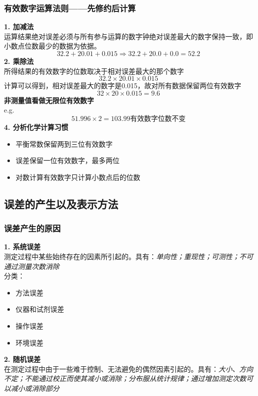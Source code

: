 \documentclass[utf8,a4paper,12pt]{ctexart}
\begin{document}
\subsubsection{有效数字运算法则——先修约后计算}
{\bf 1. 加减法}\\
运算结果绝对误差必须与所有参与运算的数字钟绝对误差最大的数字保持一致，即小数点位数最少的数据为依据。\\
\[32.2 + 20.01 + 0.015 \Rightarrow 32.2 + 20.0 + 0.0 = 52.2\]
{\bf 2. 乘除法}\\
所得结果的有效数字的位数取决于相对误差最大的那个数字\\
\[32.2 \times 20.01 \times 0.015\]
计算可以得到，相对误差最大的数字是0.015，故对所有数据保留两位有效数字
\[32\times 20\times 0.015 = 9.6\]
{\bf 非测量值看做无限位有效数字}\\
e.g.
\[51.996 \times 2 = 103.99 \text{有效数字位数不变}\]
{\bf 4. 分析化学计算习惯}\\
\begin{itemize}
\item 平衡常数保留两到三位有效数字
\item 误差保留一位有效数字，最多两位
\item 对数计算有效数字只计算小数点后的位数
\end{itemize}

\subsection{误差的产生以及表示方法}
\subsubsection{误差产生的原因}
{\bf 1. 系统误差}\\
测定过程中某些始终存在的因素所引起的。具有：\emph{单向性；重现性；可测性；不可通过测量次数消除}\\
分类：
\begin{itemize}
\item 方法误差
\item 仪器和试剂误差
\item 操作误差
\item 环境误差
\end{itemize}
{\bf 2. 随机误差}\\
在测定过程中由于一些难于控制、无法避免的偶然因素引起的。具有：\emph{大小、方向不定；不能通过校正而使其减小或消除；分布服从统计规律；通过增加测定次数可以减小或消除部分}
\end{document}
